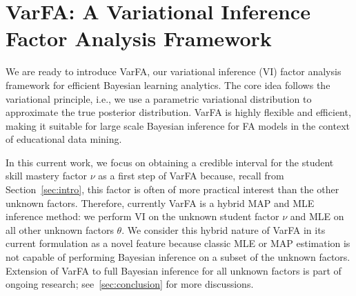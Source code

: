 \section{V{\normalfont\textbf{ar}}FA: A Variational Inference Factor Analysis Framework}
\label{sec:method}
%
We are ready to introduce VarFA, our variational inference (VI) factor analysis
framework for efficient Bayesian learning analytics. The core idea follows the
variational principle, i.e., we use a parametric variational distribution to
approximate the true posterior distribution. VarFA is highly flexible and
efficient, making it suitable for large scale Bayesian inference for FA models
in the context of educational data mining.

In this current work, we focus on obtaining a credible interval for the student
skill mastery factor $\nu$ as a first step of VarFA because, recall from
Section~\ref{sec:intro}, this factor is often of more practical interest than
the other unknown factors. Therefore, currently VarFA is a hybrid MAP and MLE
inference method: we perform VI on the unknown student factor $\nu$ and MLE on
all other unknown factors $\theta$. We consider this hybrid nature of VarFA in
its current formulation as a novel feature because classic MLE or MAP
estimation is not capable of performing Bayesian inference on a subset of the
unknown factors.
%
Extension of VarFA to full Bayesian inference for all unknown factors is part
of ongoing research; see~\ref{sec:conclusion} for more discussions.
%
